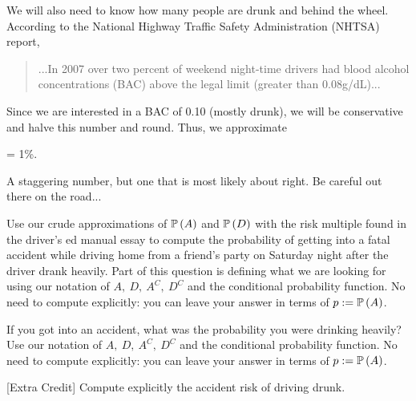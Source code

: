 \documentclass[12pt]{article}
\begin{document}
We will also need to know how many people are drunk and behind the wheel. According to the National Highway Traffic Safety Administration (NHTSA) report,

\begin{quotation} \sf
\noindent ...In 2007 over two percent of weekend night-time drivers had blood alcohol concentrations 
(BAC) above the legal limit (greater than 0.08g/dL)...
\end{quotation}

Since we are interested in a BAC of 0.10 (mostly drunk), we will be conservative and halve this number and round. Thus, we approximate 

\beqn
{} = 1\%.
\eeqn

 A staggering number, but one that is most likely about right. Be careful out there on the road... \pagebreak

\benum

 Use our crude approximations of $\mathbb{P}\left(A\right)$ and $\mathbb{P}\left(D\right)$ with the risk multiple found in the driver's ed manual essay to compute the probability of getting into a fatal accident while driving home from a friend's party on Saturday night after the driver drank heavily. Part of this question is defining what we are looking for using our notation of $A,~D,~A^C,~D^C$ and the conditional probability function. No need to compute explicitly: you can leave your answer in terms of $p := \mathbb{P}\left(A\right)$. 

 If you got into an accident, what was the probability you were drinking heavily? Use our notation of $A,~D,~A^C,~D^C$ and the conditional probability function. No need to compute explicitly: you can leave your answer in terms of $p := \mathbb{P}\left(A\right)$. 

 [Extra Credit] Compute explicitly the accident risk of driving drunk. 
\vspace{3cm}
\eenum
\end{document}
